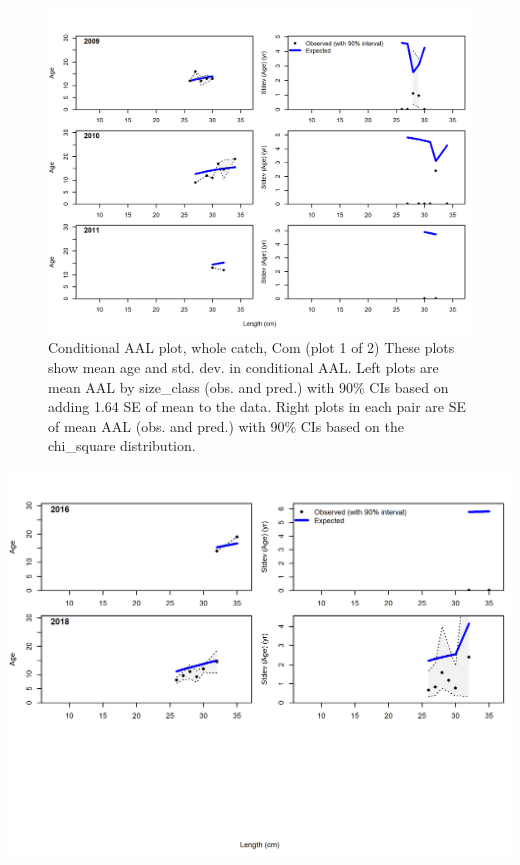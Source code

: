\documentclass[12pt,]{article}
\begin{document}
\begin{figure}
\centering
\includegraphics{./r4ss/plots_mod1/comp_condAALfit_Andre_plotsflt1mkt0_page1.png}
\caption{Conditional AAL plot, whole catch, Com (plot 1 of 2) These
plots show mean age and std. dev. in conditional AAL. Left plots are
mean AAL by size\_class (obs. and pred.) with 90\% CIs based on adding
1.64 SE of mean to the data. Right plots in each pair are SE of mean AAL
(obs. and pred.) with 90\% CIs based on the chi\_square distribution.
\label{fig:mod1_6_comp_condAALfit_Andre_plotsflt1mkt0_page1}}
\end{figure}

\includegraphics{./r4ss/plots_mod1/comp_condAALfit_Andre_plotsflt1mkt0_page2.png}
\end{document}
